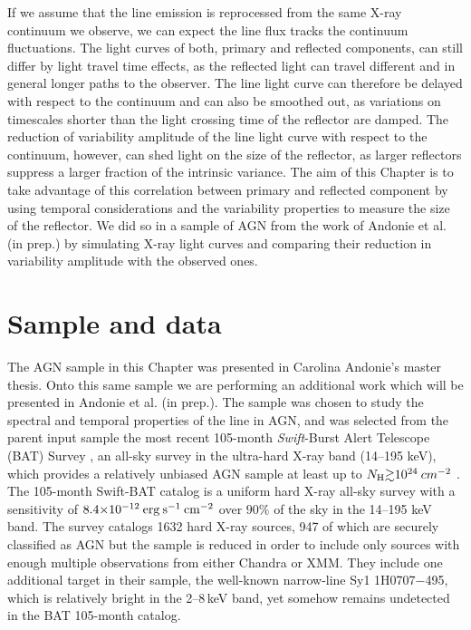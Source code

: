 If we assume that the \kalfa{} line emission is reprocessed from the same X-ray continuum we observe, we can expect the \kalfa{} line flux tracks the continuum fluctuations. The light curves of both, primary and reflected components, can still differ by light travel time effects, as the reflected light can travel different and in general longer paths to the observer. The \kalfa{} line light curve can therefore be delayed with respect to the continuum and can also be smoothed out, as variations on timescales shorter than the light crossing time of the reflector are damped. The reduction of variability amplitude of the \kalfa{} line light curve with respect to the continuum, however, can shed light on the size of the reflector, as larger reflectors suppress a larger fraction of the intrinsic variance. The aim of this Chapter is to take advantage of this correlation between primary and reflected component by using temporal considerations and the variability properties to measure the size of the reflector. We did so in a sample of AGN from the work of Andonie et al. (in prep.) by simulating X-ray light curves and comparing their reduction in variability amplitude with the observed ones.

\section{Sample and data}
The AGN sample in this Chapter was presented in Carolina Andonie's master thesis. Onto this same sample we are performing an additional work which will be presented in Andonie et al. (in prep.). The sample was chosen to study the spectral and temporal properties of the \kalfa{} line in AGN, and was selected from the parent input sample the most recent 105-month \textit{Swift}-Burst Alert Telescope (BAT) Survey \citep{2018ApJS..235....4O}, an all-sky survey in the ultra-hard X-ray band (14--195 keV), which provides a relatively unbiased AGN sample at least up to $N_{\rm H}{\gtrsim}10^{24}\:cm^{-2}$ \citep{2015ApJ...815L..13R}. The 105-month Swift-BAT catalog is a uniform hard X-ray all-sky survey with a sensitivity of $8.4 {\times} 10^{-12}\: {\rm erg\:s^{-1}\:cm^{-2}}$ over $90\%$ of the sky in the 14–195 keV band. The survey catalogs 1632 hard X-ray sources, 947 of which are securely classified as AGN but the sample is reduced in order to include only sources with enough multiple observations from either Chandra or XMM. They include one additional target in their sample, the well-known narrow-line Sy1 1H0707$-$495, which is relatively bright in the 2--8\,keV band, yet somehow remains undetected in the BAT 105-month catalog.

